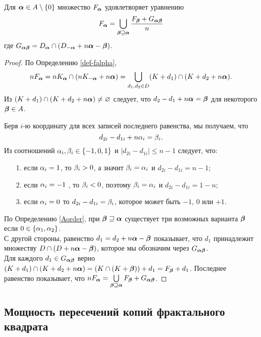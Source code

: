 \begin{theorem}\label{thm:falpha}
Для ${\bm{\alpha}}\in A\setminus\{0\}$ множество $F_{\bm{\alpha}}$ удовлетворяет уравнению
\begin{equation}\label{sideint}
 F_{\bm{\alpha}}=\bigcup\limits_{{\bm{\beta}}\sqsupseteq{\bm{\alpha}}} \dfrac{F_{\bm{\beta}}+G_{{\bm{\alpha}}{\bm{\beta}}}}{n}
 \end{equation}
где 
$G_{{\bm{\alpha}}{\bm{\beta}}}=D_{\bm{\alpha}}\cap(D_{-{\bm{\alpha}}}+n{\bm{\alpha}}-{\bm{\beta}})$.
\end{theorem}

\begin{proof}
По Определению \ref{def-falpha},
\begin{equation}\label{line}
 nF_{\bm{\alpha}}=nK_{\bm{\alpha}} \cap (nK_{-{\bm{\alpha}}}+n{\bm{\alpha}})= 
 \bigcup\limits_{d_1,d_2\in D}(K+d_1)\cap (K+d_2+n{\bm{\alpha}}).
 \end{equation}
Из $(K+d_1)\cap (K+d_2+n{\bm{\alpha}})\neq\varnothing$ следует, что $d_2-d_1+n{\bm{\alpha}}={\bm{\beta}}$ для некоторого ${\bm{\beta}}\in A$.

Беря $i$-ю координату для всех записей последнего равенства, мы получаем, что
$$d_{2i}-d_{1i}+n\alpha_i=\beta_i.$$ 
Из соотношений $\alpha_i,\beta_i\in\{-1,0,1\}$ и $|d_{2i}-d_{1i}|\le n-1$ следует, что:\\ 
\begin{itemize}[nolistsep]
 \item[1.] если $\alpha_i=1$, то $\beta_i>0$, а значит $\beta_i=\alpha_i$ и $d_{2i}-d_{1i}=n-1$;
 \item[2.] если $\alpha_i=-1$ , то $\beta_i<0$, поэтому $\beta_i=\alpha_i$ и $d_{2i}-d_{1i}=1-n$;
 \item[3.] если $\alpha_i=0$ то $d_{2i}-d_{1i}=\beta_i$, которое может быть $-1$, $0$ или $+1$.
\end{itemize}

По Определению \ref{Aorder}, при ${\bm{\beta}}\sqsupseteq{\bm{\alpha}}$ существует три возможных варианта ${\bm{\beta}}$ если $0\in\{\alpha_1,\alpha_2\}$.\\
С другой стороны, равенство $d_1=d_2+n{\bm{\alpha}}-{\bm{\beta}}$ показывает, что $d_1$ принадлежит множеству $D\cap(D+n{\bm{\alpha}}-{\bm{\beta}})$, которое мы обозначим через $G_{{\bm{\alpha}}{\bm{\beta}}}$.\\
Для каждого $d_1\in G_{{\bm{\alpha}}{\bm{\beta}}}$ верно $(K+d_1)\cap (K+d_2+n{\bm{\alpha}})= (K\cap(K+{\bm{\beta}}))+d_1= F_{\bm{\beta}}+d_1$.
Последнее равенство показывает, что $nF_{\bm{\alpha}}= \bigcup\limits_{{\bm{\beta}}\sqsupseteq{\bm{\alpha}}} {F_{\bm{\beta}}+G_{{\bm{\alpha}}{\bm{\beta}}}}$.
\end{proof}


\subsection{Мощность пересечений копий фрактального квадрата}

